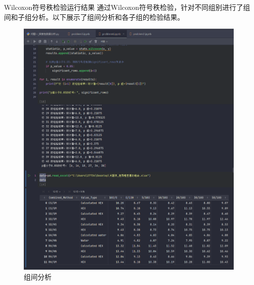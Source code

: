 \documentclass{beamer}
\begin{document}
\begin{frame}{Wilcoxon符号秩检验运行结果}
    \justifying
    通过Wilcoxon符号秩检验，针对不同组别进行了组间和子组分析。以下展示了组间分析和各子组的检验结果。
    
    \vspace{0.3cm}
    
    \begin{figure}[htbp]
        \centering
        \begin{minipage}{0.4\linewidth}
            \centering
            \includegraphics[width=\linewidth]{pic/path_to_image1.png} %
            \caption{组间分析}
        \end{minipage}
        \hspace{0.5cm}
        \begin{minipage}{0.4\linewidth}
            \centering

\end{minipage}
\end{figure}
\end{frame}
\end{document}

